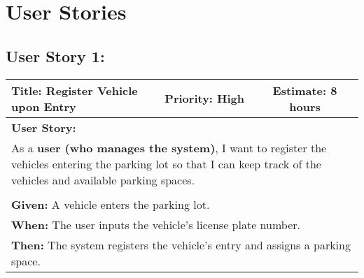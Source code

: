 \setlength{\arrayrulewidth}{0.5mm} %
\setlength{\tabcolsep}{12pt} %
\renewcommand{\arraystretch}{1.5} %

\section{User Stories}

\subsection{User Story 1:}
\begin{table}[h]
    \centering
    \begin{tabular}{|p{7cm}|p{4cm}|c|}
        \hline
        \rowcolor{lightblue}
        \textbf{Title: Register Vehicle upon Entry} & \textbf{Priority: High} & \textbf{Estimate: 8 hours} \\
        \hline
        \multicolumn{3}{|l|}{\textbf{User Story:}} \\
        \multicolumn{3}{|p{15cm}|}{As a \textbf{user (who manages the system)}, I want to register the vehicles entering the parking lot so that I can keep track of the vehicles and available parking spaces.} \\
        \hline
        \rowcolor{lightblue}
        \multicolumn{3}{|c|}{\textbf{Acceptance Criteria:}} \\
        \hline
        \multicolumn{3}{|l|}{\textbf{Given:} A vehicle enters the parking lot.} \\
        \multicolumn{3}{|l|}{\textbf{When:} The user inputs the vehicle's license plate number.} \\
        \multicolumn{3}{|l|}{\textbf{Then:} The system registers the vehicle's entry and assigns a parking space.} \\
        \hline
    \end{tabular}
\end{table}

